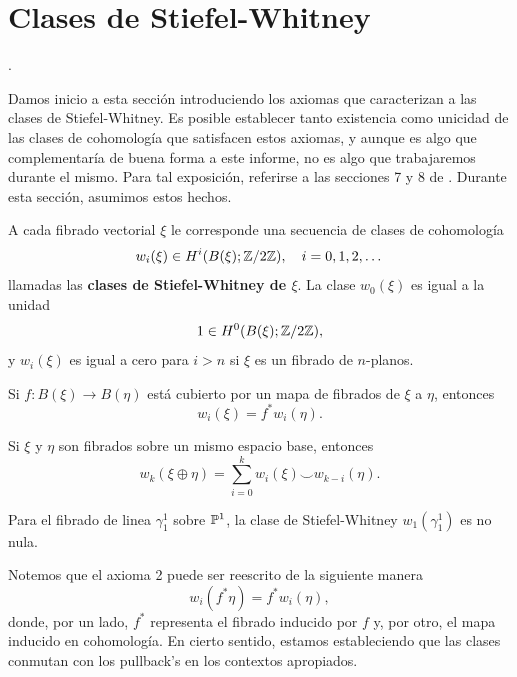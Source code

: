 \newpage
\section{Clases de Stiefel-Whitney}

\cite[\S 4]{ClasesCaracteristicas}.

Damos inicio a esta sección introduciendo los axiomas que caracterizan a las clases de Stiefel-Whitney. Es posible establecer tanto existencia como unicidad de las clases de cohomología que satisfacen estos axiomas, y aunque es algo que complementaría de buena forma a este informe, no es algo que trabajaremos durante el mismo. Para tal exposición, referirse a las secciones 7 y 8 de \cite{ClasesCaracteristicas}. Durante esta sección, asumimos estos hechos.

\begin{axiom}
	A cada fibrado vectorial $\xi$ le corresponde una secuencia de clases de cohomología
	\[ w_{i}(\xi) \in H^{i}(B(\xi); \Z \slash 2\Z), \quad i = 0,1,2,\dots \]
	llamadas las \textbf{clases de Stiefel-Whitney de $\xi$}. La clase $w_{0}(\xi)$ es igual a la unidad
	\[ 1 \in H^{0}(B(\xi); \Z \slash 2\Z), \]
	y $w_{i}(\xi)$ es igual a cero para $i > n$ si $\xi$ es un fibrado de $n$-planos.
\end{axiom}

\begin{axiom}[Naturalidad]
	Si $f \colon B(\xi) \to B(\eta)$ está cubierto por un mapa de fibrados de $\xi$ a $\eta$, entonces
	\[ w_{i}(\xi) = f^{*}w_{i}(\eta). \]
\end{axiom}

\begin{axiom}
	Si $\xi$ y $\eta$ son fibrados sobre un mismo espacio base, entonces 
	\[ w_{k}(\xi \oplus \eta) = \sum_{i=0}^{k} w_{i}(\xi) \smile w_{k-i}(\eta). \]
\end{axiom}

\begin{axiom}
	Para el fibrado de linea $\gamma_{1}^{1}$ sobre $\P^{1}$, la clase de Stiefel-Whitney $w_{1}(\gamma_{1}^{1})$ es no nula.
\end{axiom}

Notemos que el axioma 2 puede ser reescrito de la siguiente manera
\[ w_{i}(f^{*}\eta) = f^{*}w_{i}(\eta), \]
donde, por un lado, $f^{*}$ representa el fibrado inducido por $f$ y, por otro, el mapa inducido en cohomología. En cierto sentido, estamos estableciendo que las clases conmutan con los pullback's en los contextos apropiados. \par

